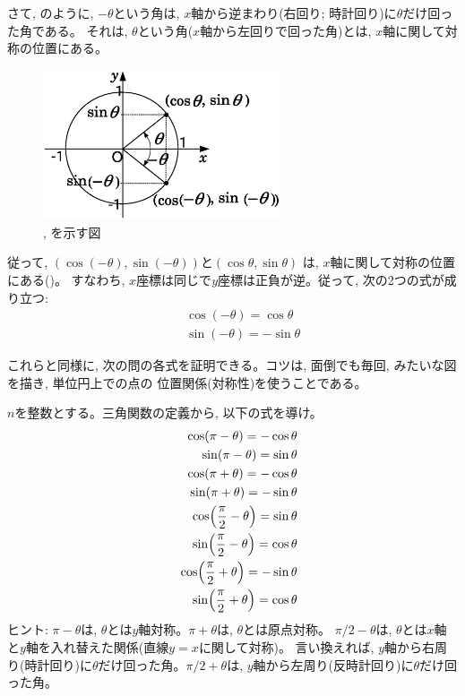 さて, のように, $-\theta$という角は, 
$x$軸から逆まわり(右回り; 時計回り)に$\theta$だけ回った角である。
それは, $\theta$という角($x$軸から左回りで回った角)とは, 
$x$軸に関して対称の位置にある。
\begin{figure}[h]
    \centering
    \includegraphics[width=7cm]{unit_circle2.eps}
    \caption{, を示す図}\label{fig:unit_circle2}
\end{figure}
従って, 
$(\cos(-\theta), \sin(-\theta))$と$(\cos\theta, \sin\theta)$
は, $x$軸に関して対称の位置にある()。
すなわち, $x$座標は同じで$y$座標は正負が逆。従って, 次の2つの式が成り立つ:
\begin{eqnarray}
&&\cos (-\theta) = \cos \theta\label{eq:trig_cos_even}\\
&&\sin (-\theta) = - \sin \theta\label{eq:trig_sin_odd}
\end{eqnarray}

これらと同様に, 次の問の各式を証明できる。コツは, 面倒でも毎回, 
みたいな図を描き, 単位円上での点の
位置関係(対称性)を使うことである。

\begin{q}\label{q:trig_sincos3} $n$を整数とする。三角関数の定義から, 以下の式を導け。
\begin{eqnarray}
&&\cos (\pi - \theta) = - \cos \theta\\
&&\sin (\pi - \theta) = \sin \theta\\
&&\cos (\pi + \theta) = - \cos \theta\\
&&\sin (\pi + \theta) = - \sin \theta\\
&&\cos \Bigl(\frac{\pi}{2} - \theta\Bigr) = \sin \theta\label{eq:trig_cosx_2pi}\\
&&\sin \Bigl(\frac{\pi}{2} - \theta\Bigr) = \cos \theta\label{eq:trig_sinx_2pi}\\
&&\cos \Bigl(\frac{\pi}{2} + \theta\Bigr) = -\sin \theta\\
&&\sin \Bigl(\frac{\pi}{2} + \theta\Bigr) = \cos \theta\label{eq:trig_sinx_plus_pi2}
\end{eqnarray}
ヒント: $\pi-\theta$は, $\theta$とは$y$軸対称。$\pi+\theta$は, $\theta$とは原点対称。
$\pi/2-\theta$は, $\theta$とは$x$軸と$y$軸を入れ替えた関係(直線$y=x$に関して対称)。
言い換えれば, $y$軸から右周り(時計回り)に$\theta$だけ回った角。$\pi/2+\theta$は, 
$y$軸から左周り(反時計回り)に$\theta$だけ回った角。
\end{q}

